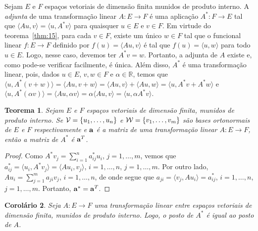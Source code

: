 \documentclass[12pt,a4paper]{article}
\newcommand{\ang}[1]{\langle#1\rangle}
\newcommand{\R}{\mathbb{R}}
\newtheorem{thm}{Teorema}[section]
\newtheorem{cor}[thm]{Corolário}
\theoremstyle{definition}
\begin{document}
Sejam $E$ e $F$ espaços vetoriais de dimensão finita munidos de
produto interno. A \textit{adjunta} de uma transformação linear
$A:E\to F$ é uma aplicação $A^*:F\to E$ tal que
$\ang{Au,v}=\ang{u,A^*v}$ para quaisquer $u\in E$ e $v\in F$. Em
virtude do teorema~\ref{thm:15}, para cada $v\in F$, existe um único
$w\in F$ tal que o funcional linear $f:E\to F$ definido por
$f(u)=\ang{Au,v}$ é tal que $f(u)=\ang{u,w}$ para todo $u\in E$. Logo,
nesse caso, devemos ter $A^*v=w$. Portanto, a adjunta de $A$ existe e,
como pode-se verificar facilmente, é única. Além disso, $A^*$ é uma
transformação linear, pois, dados $u\in E$, $v,w\in F$ e
$\alpha\in\R$, temos que
$\ang{u,A^*(v+w)}=\ang{Au,v+w}=\ang{Au,v}+\ang{Au,w}=\ang{u,A^*v+A^*w}$
e
$\ang{u,A^*(\alpha v)}=\ang{Au,\alpha
  v}=\alpha\ang{Au,v}=\ang{u,\alpha A^*v}$.

\begin{thm}
  Sejam $E$ e $F$ espaços vetoriais de dimensão finita, munidos de
  produto interno. Se ${\cal V}=\{u_1,\ldots,u_n\}$ e
  ${\cal W}=\{v_1,\ldots,v_m\}$ são bases ortonormais de $E$ e $F$
  respectivamente e ${\bf a}$ é a matriz de uma transformação linear
  $A:E\to F$, então a matriz de $A^*$ é ${\bf a}^T$.
\end{thm}
\begin{proof}
  Como $A^*v_j=\sum_{i=1}^na^*_{ij}u_i$, $j=1,\ldots,m$, vemos que
  $a^*_{ij}=\ang{u_i,A^*v_j}=\ang{Au_i,v_j}$, $i=1,\ldots,n$,
  $j=1,\ldots,m$. Por outro lado, $Au_i=\sum_{j=1}^ma_{ji}v_j$,
  $i=1,\ldots,n$, de onde segue que $a_{ji}=\ang{v_j,Au_i}=a_{ij}^*$,
  $i=1,\ldots,n$, $j=1,\ldots,m$. Portanto, ${\bf a}^*={\bf a}^T$.
\end{proof}
\begin{cor}
  Seja $A:E\to F$ uma transformação linear entre espaços vetoriais de
  dimensão finita, munidos de produto interno. Logo, o posto de $A^*$
  é igual ao posto de $A$.
\end{cor}
\end{document}
